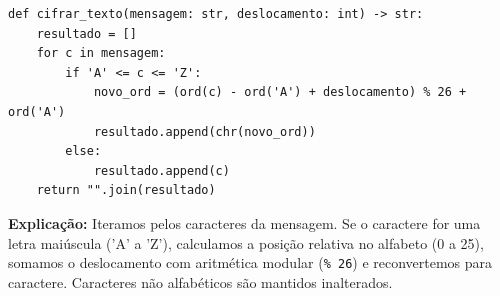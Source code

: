 \ifmostrarGabarito
\begin{verbatim}
def cifrar_texto(mensagem: str, deslocamento: int) -> str:
    resultado = []
    for c in mensagem:
        if 'A' <= c <= 'Z':
            novo_ord = (ord(c) - ord('A') + deslocamento) % 26 + ord('A')
            resultado.append(chr(novo_ord))
        else:
            resultado.append(c)
    return "".join(resultado)
\end{verbatim}

\textbf{Explicação:}
Iteramos pelos caracteres da mensagem. Se o caractere for uma letra maiúscula ('A' a 'Z'), calculamos a posição relativa no alfabeto (0 a 25), somamos o deslocamento com aritmética modular (\texttt{\% 26}) e reconvertemos para caractere. Caracteres não alfabéticos são mantidos inalterados.
\else
{}
\clearpage
{}
\clearpage
\fi
